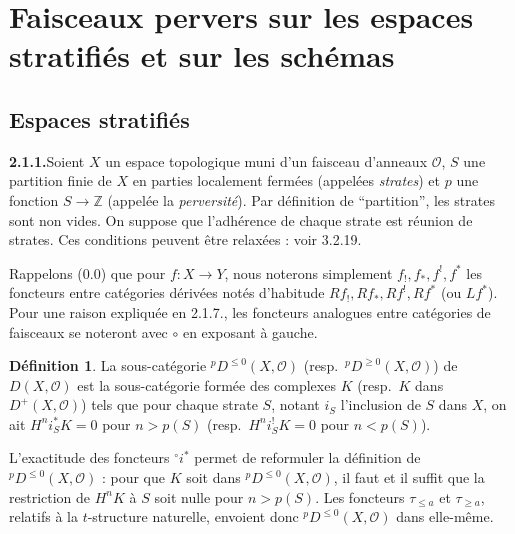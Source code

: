 \documentclass[12pt,a4paper]{article}
\theoremstyle{plain}
\theoremstyle{definition}
\newtheorem{definition}[theorem]{D\'efinition}
\begin{document}
\section{Faisceaux pervers sur les espaces stratifi\'es et sur les sch\'emas}

\subsection{Espaces stratifi\'es}

\noindent\textbf{2.1.1.}\quad Soient $X$ un espace topologique muni d'un faisceau d'anneaux $\mathcal{O}$, $S$ une partition finie de $X$ en parties localement ferm\'ees (appel\'ees \emph{strates}) et $p$ une fonction $S \to \mathbb{Z}$ (appel\'ee la \emph{perversit\'e}). Par d\'efinition de ``partition'', les strates sont non vides. On suppose que l'adh\'erence de chaque strate est r\'eunion de strates. Ces conditions peuvent \^etre relax\'ees : voir 3.2.19.

Rappelons (0.0) que pour $f : X \to Y$, nous noterons simplement $f_!, f_*, f^!, f^*$ les foncteurs entre cat\'egories d\'eriv\'ees not\'es d'habitude $Rf_!, Rf_*, Rf^!, Rf^*$ (ou $Lf^*$). Pour une raison expliqu\'ee en 2.1.7., les foncteurs analogues entre cat\'egories de faisceaux se noteront avec $\circ$ en exposant \`a gauche.

\begin{definition}\label{def:2.1.2}
La sous-cat\'egorie ${}^p D^{\leqslant 0}(X, \mathcal{O})$ (resp.\ ${}^p D^{\geqslant 0}(X, \mathcal{O})$) de $D(X, \mathcal{O})$ est la sous-cat\'egorie form\'ee des complexes $K$ (resp.\ $K$ dans $D^+(X, \mathcal{O})$) tels que pour chaque strate $S$, notant $i_S$ l'inclusion de $S$ dans $X$, on ait $H^n i_S^* K = 0$ pour $n > p(S)$ (resp.\ $H^n i_S^! K = 0$ pour $n < p(S)$).
\end{definition}

L'exactitude des foncteurs ${}^\circ i^*$ permet de reformuler la d\'efinition de ${}^p D^{\leqslant 0}(X, \mathcal{O})$ : pour que $K$ soit dans ${}^p D^{\leqslant 0}(X, \mathcal{O})$, il faut et il suffit que la restriction de $H^n K$ \`a $S$ soit nulle pour $n > p(S)$. Les foncteurs $\tau_{\leqslant a}$ et $\tau_{\geqslant a}$, relatifs \`a la $t$-structure naturelle, envoient donc ${}^p D^{\leqslant 0}(X, \mathcal{O})$ dans elle-m\^eme.
\end{document}
